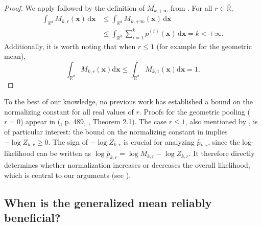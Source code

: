 \documentclass[accepted]{uai2026} %
\newcommand{\R}{\mathbb{R}}
\newcommand{\vx}{\mathbf{x}}
\newcommand{\vd}{\mathrm{d}}
\newcommand{\compose}[1]{\overset{\circ}{#1}}
\begin{document}
\begin{proof}
We apply  followed by the definition of $M_{k,+\infty}$ from . For all $r \in \overline{\R}$,
\begin{align}
\int_{\R^d} M_{k,r}(\vx)\,\vd \vx
&\leq \int_{\R^d} M_{k,+\infty}(\vx)\,\vd \vx \\
&\leq \int_{\R^d} \sum_{i=1}^k p^{(i)}(\vx)\,\vd \vx = k < +\infty.
\end{align}
Additionally, it is worth noting that when $r \leq 1$ (for example for the geometric mean),
\begin{equation}\label{eq: case r equal 1}
\int_{\R^d} M_{k,r}(\vx) \vd \vx \leq \int_{\R^d} M_{k,1}(\vx) \vd\vx=1.
\end{equation}
\end{proof}
To the best of our knowledge, no previous work has established a bound on the normalizing constant for all real values of $r$. Proofs for the geometric pooling ($r=0$) appear in (\citealp{genest1986characterization}, p. 489, \citealp{carvalho2023}, Theorem 2.1). The case $r \leq 1$, also mentioned by \citet[Chapter~11]{cooke1991experts}, is of particular interest: the bound on the normalizing constant in  implies $-\log Z_{k,r} \geq 0$. The sign of $-\log Z_{k,r}$ is crucial for analyzing $\compose{p}_{k,r}$, since the log-likelihood can be written as $\log \compose{p}_{k,r} = \log M_{k,r} - \log Z_{k,r}$. It therefore directly determines whether normalization increases or decreases the overall likelihood, which is central to our arguments (see ).




\subsection{When is the generalized mean reliably beneficial?}
\label{section: when provably reliable}
\end{document}
